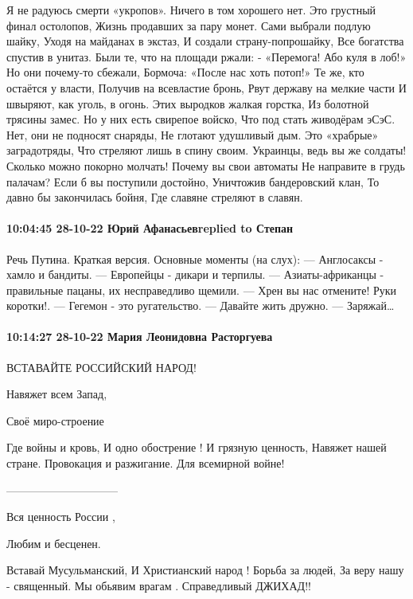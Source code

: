 Я не радуюсь смерти «укропов».
Ничего в том хорошего нет.
Это грустный финал остолопов,
Жизнь продавших за пару монет.
Сами выбрали подлую шайку,
Уходя на майданах в экстаз,
И создали страну-попрошайку,
Все богатства спустив в унитаз.
Были те, что на площади ржали:
- «Перемога! Або куля в лоб!»
Но они почему-то сбежали,
Бормоча: «После нас хоть потоп!»
Те же, кто остаётся у власти,
Получив на всевластие бронь,
Рвут державу на мелкие части
И швыряют, как уголь, в огонь.
Этих выродков жалкая горстка,
Из болотной трясины замес.
Но у них есть свирепое войско,
Что под стать живодёрам эСэС.
Нет, они не подносят снаряды,
Не глотают удушливый дым.
Это «храбрые» заградотряды,
Что стреляют лишь в спину своим.
Украинцы, ведь вы же солдаты!
Сколько можно покорно молчать!
Почему вы свои автоматы
Не направите в грудь палачам?
Если б вы поступили достойно,
Уничтожив бандеровский клан,
То давно бы закончилась бойня,
Где славяне стреляют в славян.

\paragraph{10:04:45 28-10-22 Юрий Афанасьевreplied to Степан}

Речь Путина. Краткая версия.
Основные моменты (на слух):
— Англосаксы - хамло и бандиты.
— Европейцы - дикари и терпилы.
— Азиаты-африканцы - правильные пацаны, их несправедливо щемили.
— Хрен вы нас отмените! Руки коротки!.
— Гегемон - это ругательство.
— Давайте жить дружно.
— Заряжай…

\paragraph{10:14:27 28-10-22 Мария Леонидовна Расторгуева}

ВСТАВАЙТЕ РОССИЙСКИЙ НАРОД!

Навяжет всем Запад,

Своё миро-строение

Где войны и кровь,
И одно обострение !
И грязную ценность,
Навяжет нашей стране.
Провокация и разжигание.
Для всемирной войне!

------------------------------

Вся ценность России ,

Любим и бесценен.

Вставай Мусульманский,
И Христианский народ !
Борьба за людей,
За веру нашу - священный.
Мы обьявим врагам .
Справедливый ДЖИХАД!!
